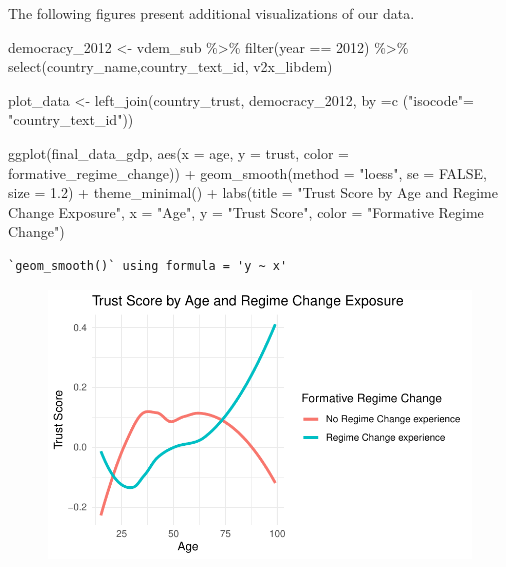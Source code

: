 \documentclass[
  letterpaper,
  DIV=11,
  numbers=noendperiod]{scrartcl}
\newenvironment{Shaded}{\begin{snugshade}}{\end{snugshade}}
\newcommand{\AttributeTok}[1]{\textcolor[rgb]{0.40,0.45,0.13}{#1}}
\newcommand{\ConstantTok}[1]{\textcolor[rgb]{0.56,0.35,0.01}{#1}}
\newcommand{\DecValTok}[1]{\textcolor[rgb]{0.68,0.00,0.00}{#1}}
\newcommand{\FloatTok}[1]{\textcolor[rgb]{0.68,0.00,0.00}{#1}}
\newcommand{\FunctionTok}[1]{\textcolor[rgb]{0.28,0.35,0.67}{#1}}
\newcommand{\NormalTok}[1]{\textcolor[rgb]{0.00,0.23,0.31}{#1}}
\newcommand{\OtherTok}[1]{\textcolor[rgb]{0.00,0.23,0.31}{#1}}
\newcommand{\SpecialCharTok}[1]{\textcolor[rgb]{0.37,0.37,0.37}{#1}}
\newcommand{\StringTok}[1]{\textcolor[rgb]{0.13,0.47,0.30}{#1}}
\begin{document}
The following figures present additional visualizations of our data.

\begin{Shaded}
\begin{Highlighting}[]
\NormalTok{democracy\_2012 }\OtherTok{\textless{}{-}}\NormalTok{ vdem\_sub }\SpecialCharTok{\%\textgreater{}\%}
  \FunctionTok{filter}\NormalTok{(year }\SpecialCharTok{==} \DecValTok{2012}\NormalTok{) }\SpecialCharTok{\%\textgreater{}\%}
  \FunctionTok{select}\NormalTok{(country\_name,country\_text\_id, v2x\_libdem)}

\NormalTok{plot\_data }\OtherTok{\textless{}{-}} \FunctionTok{left\_join}\NormalTok{(country\_trust, democracy\_2012, }\AttributeTok{by =}\FunctionTok{c}\NormalTok{ (}\StringTok{"isocode"}\OtherTok{=} \StringTok{"country\_text\_id"}\NormalTok{))}


\FunctionTok{ggplot}\NormalTok{(final\_data\_gdp, }\FunctionTok{aes}\NormalTok{(}\AttributeTok{x =}\NormalTok{ age, }\AttributeTok{y =}\NormalTok{ trust, }\AttributeTok{color =}\NormalTok{ formative\_regime\_change)) }\SpecialCharTok{+} 
  \FunctionTok{geom\_smooth}\NormalTok{(}\AttributeTok{method =} \StringTok{"loess"}\NormalTok{, }\AttributeTok{se =} \ConstantTok{FALSE}\NormalTok{, }\AttributeTok{size =} \FloatTok{1.2}\NormalTok{) }\SpecialCharTok{+}
  \FunctionTok{theme\_minimal}\NormalTok{() }\SpecialCharTok{+}
  \FunctionTok{labs}\NormalTok{(}\AttributeTok{title =} \StringTok{"Trust Score by Age and Regime Change Exposure"}\NormalTok{,}
       \AttributeTok{x =} \StringTok{"Age"}\NormalTok{,}
       \AttributeTok{y =} \StringTok{"Trust Score"}\NormalTok{,}
       \AttributeTok{color =} \StringTok{"Formative Regime Change"}\NormalTok{)}
\end{Highlighting}
\end{Shaded}

\begin{verbatim}
`geom_smooth()` using formula = 'y ~ x'
\end{verbatim}

\begin{figure}[H]

{\centering \includegraphics{Milestone-2-Data_files/figure-pdf/unnamed-chunk-10-1.pdf}

}

\end{figure}
\end{document}
